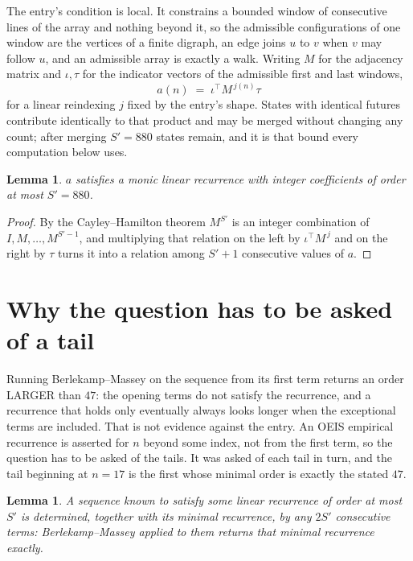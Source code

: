 \documentclass[11pt,a4paper]{article}
\theoremstyle{plain}
\newtheorem{lemma}[theorem]{Lemma}
\theoremstyle{definition}
\begin{document}
The entry's condition is local. It constrains a bounded window of consecutive lines of the
array and nothing beyond it, so the admissible configurations of one window are the vertices of
a finite digraph, an edge joins $u$ to $v$ when $v$ may follow $u$, and an admissible array is
exactly a walk. Writing $M$ for the adjacency matrix and $\iota,\tau$ for the indicator vectors
of the admissible first and last windows,
\[
a(n)\;=\;\iota^{\!\top}M^{\,j(n)}\tau
\]
for a linear reindexing $j$ fixed by the entry's shape. States with identical futures
contribute identically to that product and may be merged without changing any count; after
merging $S'=880$ states remain, and it is that bound every computation below uses.

\begin{lemma}\label{lem:cf}
$a$ satisfies a monic linear recurrence with integer coefficients of order at most $S'=880$.
\end{lemma}

\begin{proof}
By the Cayley--Hamilton theorem $M^{S'}$ is an integer combination of $I,M,\dots,M^{S'-1}$,
and multiplying that relation on the left by $\iota^{\!\top}M^{\,j}$ and on the right by
$\tau$ turns it into a relation among $S'+1$ consecutive values of $a$.
\end{proof}

\section{Why the question has to be asked of a tail}

Running Berlekamp--Massey on the sequence from its first term returns an order LARGER than $47$: the opening terms do not satisfy the recurrence, and a recurrence that holds only eventually always looks longer when the exceptional terms are included. That is not evidence against the entry. An OEIS empirical recurrence is asserted for $n$ beyond some index, not from the first term, so the question has to be asked of the tails. It was asked of each tail in turn, and the tail beginning at $n=17$ is the first whose minimal order is exactly the stated $47$.

\begin{lemma}\label{lem:bm}
A sequence known to satisfy some linear recurrence of order at most $S'$ is determined,
together with its minimal recurrence, by any $2S'$ consecutive terms: Berlekamp--Massey applied
to them returns that minimal recurrence exactly.
\end{lemma}
\end{document}
